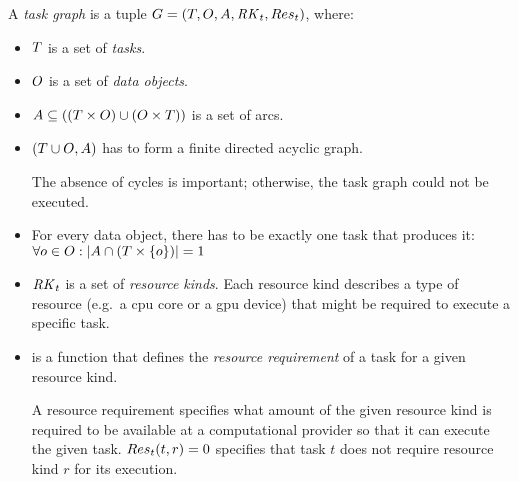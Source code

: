 \vspace{2mm} A \emph{task graph} is a tuple
$G = (T, O, A, \mathit{RK}_t, Res_t)$, where:
\begin{itemize}[itemsep=0pt]
	\item $T$ is a set of \emph{tasks}.
	\item $O$ is a set of \emph{data objects}.
	\item $A \subseteq ((T\times{}O) \cup (O\times{}T))$
	is a set of arcs.
	\item $(T \cup O, A)$ has to form a finite directed acyclic graph.

	The absence of cycles is important; otherwise, the task graph could not be executed.
	\item For every data object, there has to be exactly one task that produces it: \vspace{1mm}\\
	$\forall o \in O: |A \cap (T \times \{o\})| = 1$
	\item $\mathit{RK}_t$ is a set of \emph{resource kinds}. Each resource kind
	      describes a type of resource (e.g.\ a \gls{cpu} core or a \gls{gpu} device)
	      that might be required to execute a specific task.
	\item {} is a function that defines the
	      \emph{resource requirement} of a task for a given resource kind.

	      A resource requirement specifies what amount of the given resource kind is required to
		  be available at a computational provider so that it can execute the given task.
		  $Res_t(t, r) = 0$ specifies that task $t$ does not require resource kind $r$ for its
		  execution.
\end{itemize}

